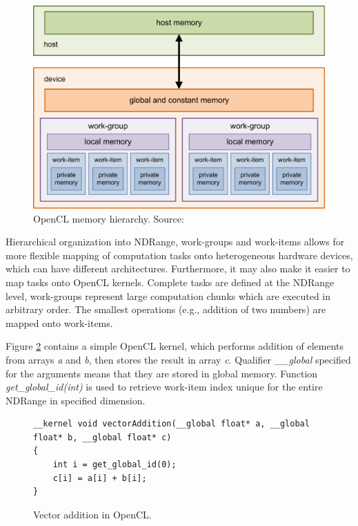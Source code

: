\documentclass
[
    digital, %
    oneside, %
    table, %
    nolof, %
    nolot, %
    nocover %
]{fithesis3}
\begin{document}
\begin{figure}
    \begin{center}
    \includegraphics[width=125mm]{resources/opencl_hierarchy.png}
    \end{center}
    \caption{OpenCL memory hierarchy. Source: \cite{opencl-hierarchy-diagram}}
    \label{opencl-hierarchy}
\end{figure}

Hierarchical organization into NDRange, work-groups and work-items allows for more flexible mapping of computation tasks onto heterogeneous hardware
devices, which can have different architectures. Furthermore, it may also make it easier to map tasks onto OpenCL kernels. Complete tasks are defined
at the NDRange level, work-groups represent large computation chunks which are executed in arbitrary order. The smallest operations (e.g., addition of
two numbers) are mapped onto work-items.

Figure \ref{vector_addition} contains a simple OpenCL kernel, which performs addition of elements from arrays \textit{a} and \textit{b}, then stores
the result in array \textit{c}. Qualifier \textit{\_\_global} specified for the arguments means that they are stored in global memory. Function
\textit{get\_global\_id(int)} is used to retrieve work-item index unique for the entire NDRange in specified dimension.
\begin{figure}
\begin{lstlisting}
__kernel void vectorAddition(__global float* a, __global float* b, __global float* c)
{
    int i = get_global_id(0);
    c[i] = a[i] + b[i];
}
\end{lstlisting}
\caption{Vector addition in OpenCL.}
\label{vector_addition}
\end{figure}
\end{document}
